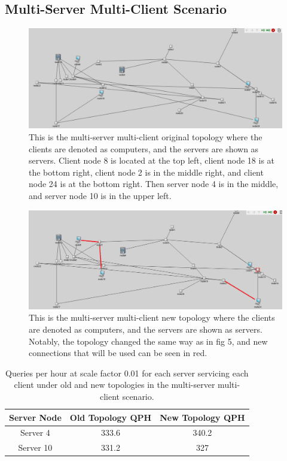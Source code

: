 \subsection{Multi-Server Multi-Client Scenario}

\begin{figure}[tp]
\centering
\includegraphics[width=0.5 \textwidth]{figures/MultServerOrig}
\caption{This is the multi-server multi-client original topology where the clients are denoted as computers, and the servers are shown as servers. Client node 8 is located at the top left, client node 18 is at the bottom right, client node 2 is in the middle right, and client node 24 is at the bottom right. Then server node 4 is in the middle, and server node 10 is in the upper left.
}
\end{figure}

\begin{figure}[tp]
\centering
\includegraphics[width=0.5 \textwidth]{figures/MultServerNew}
\caption{This is the multi-server multi-client new topology where the clients are denoted as computers, and the servers are shown as servers. Notably, the topology changed the same way as in fig 5, and new connections that will be used can be seen in red.
}
\end{figure}

\begin{table}[h!]
\centering
\begin{tabular}{|c|c|c|}
\hline
Server Node & Old Topology QPH & New Topology QPH \\ \hline
Server 4 & 333.6 & 340.2  \\ \hline
Server 10 & 331.2 & 327 \\ \hline
\end{tabular}
\caption{Queries per hour at scale factor 0.01 for each server servicing each client under old and new topologies in the multi-server multi-client scenario.}
\label{tab:my_label}
\end{table}

